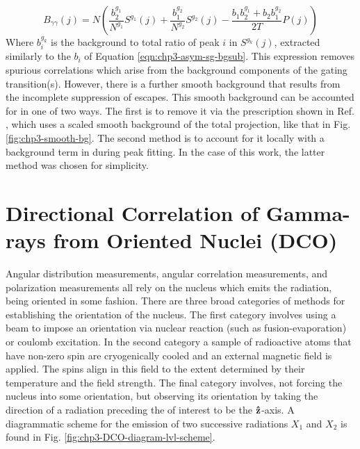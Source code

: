 \begin{equation}
\label{eqn:chp3-asym-bg-dg-exp}
B_{\gamma{}\gamma{}}(j)=N\left(\frac{b^{g_1}_2}{N^{g_1}}S^{g_1}(j) + \frac{b^{g_2}_1}{N^{g_2}}S^{g_2}(j) - \frac{b_1b^{g_1}_2+b_2b^{g_2}_1}{2T}P(j) \right)
\end{equation}
Where $b^{g_k}_i$ is the background to total ratio of peak $i$ in $S^{g_k}(j)$, extracted similarly to the $b_i$ of Equation \ref{eqn:chp3-asym-sg-bgsub}. This expression removes spurious correlations which arise from the background components of the gating transition(s). However, there is a further smooth background that results from the incomplete suppression of escapes. This smooth background can be accounted for in one of two ways. The first is to remove it via the prescription shown in Ref. \cite{asymBGSub}, which uses a scaled smooth background of the total projection, like that in Fig. \ref{fig:chp3-smooth-bg}. The second method is to account for it locally with a background term in during peak fitting. In the case of this work, the latter method was chosen for simplicity.

\section{Directional Correlation of Gamma-rays from Oriented Nuclei (DCO)}
\label{sec:exp-pr-data-ang}
Angular distribution measurements, angular correlation measurements, and polarization measurements all rely on the nucleus which emits the radiation, being oriented in some fashion. There are three broad categories of methods for establishing the orientation of the nucleus. The first category involves using a beam to impose an orientation via nuclear reaction (such as fusion-evaporation) or coulomb excitation. In the second category a sample of radioactive atoms that have non-zero spin are cryogenically cooled and an external magnetic field is applied. The spins align in this field to the extent determined by their temperature and the field strength. The final category involves, not forcing the nucleus into some orientation, but observing its orientation by taking the direction of a radiation preceding the \gr{} of interest to be the $\boldsymbol{\hat{\textbf{z}}}$-axis. A diagrammatic scheme for the emission of two successive radiations $X_1$ and $X_2$ is found in Fig. \ref{fig:chp3-DCO-diagram-lvl-scheme}.

